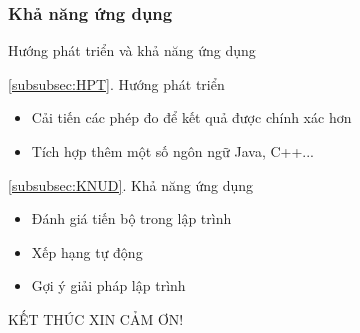 \subsubsection*{Khả năng ứng dụng}
\label{subsubsec:KNUD}
\begin{frame}{Hướng phát triển và khả năng ứng dụng}
	\begin{block}{\ref{subsubsec:HPT}. Hướng phát triển}
		\begin{itemize}
			\item Cải tiến các phép đo để kết quả được chính xác hơn
			\item Tích hợp thêm một số ngôn ngữ Java, C++...
		\end{itemize}
	\end{block} \pause
	\begin{block}{\ref{subsubsec:KNUD}. Khả năng ứng dụng}
		\begin{itemize}
			\item Đánh giá tiến bộ trong lập trình
			\item Xếp hạng tự động
			\item Gợi ý giải pháp lập trình
		\end{itemize}
	\end{block}
\end{frame}

\begin{frame}{KẾT THÚC}
\centering
{\Huge XIN CẢM ƠN!}
\end{frame}

